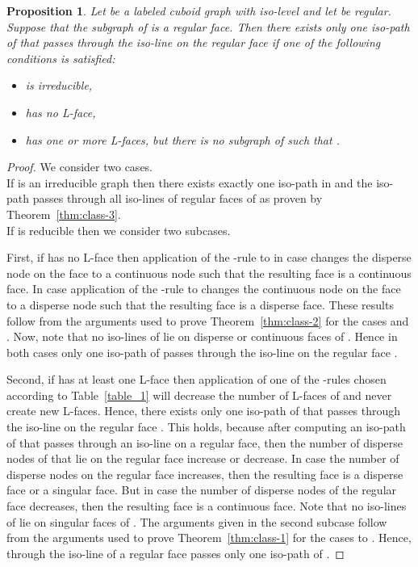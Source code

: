 \documentclass[a4paper,11pt]{article}
\newtheorem{proposition}[theorem]{Proposition}
\begin{document}
\begin{proposition}
Let  be a labeled cuboid graph with iso-level  and let  be regular.
Suppose that the subgraph  of  is a regular face. Then there exists only one
iso-path of  that passes through the iso-line on the regular face  if one of the following
conditions is satisfied:
\begin{itemize}
\item[(a)]  is irreducible,
\item[(b)]  has no L-face,
\item[(c)]  has one or more L-faces, but there is no subgraph  of
 such that .
\end{itemize}
\label{prop:class-7}
\end{proposition}
\begin{proof} We consider two cases.\\

If  is an irreducible graph then there exists exactly one iso-path in  and the
iso-path passes through all iso-lines of regular faces of  as proven by Theorem~\ref{thm:class-3}. \\

If  is reducible then we consider two subcases.

First, if  has no L-face then application of the -rule to  in case  changes the disperse
node on the face to a continuous node such that the resulting face is a continuous face. In case 
application of the -rule to  changes the continuous node on the face to a disperse node such that
the resulting face is a disperse face. These results follow from the arguments used to prove
Theorem~\ref{thm:class-2} for the cases  and . Now, note that no iso-lines of  lie on
disperse or continuous faces of . Hence in both cases only one iso-path of  passes through the iso-line
on the regular face .

Second, if  has at least one L-face then application of one of the -rules chosen according to
Table~\ref{table_1} will decrease the number of L-faces of  and never create new L-faces. Hence, there
exists only one iso-path of  that passes through the iso-line on the regular face . This holds,
because after computing an iso-path of  that passes through an iso-line on a regular face, then the
number of disperse nodes of  that lie on the regular face increase or decrease. In case the number of
disperse nodes on the regular face increases, then the resulting face is a disperse face or a singular face.
But in case the number of disperse nodes of the regular face decreases, then the resulting face is a
continuous face. Note that no iso-lines of  lie on singular faces of . The arguments given in the
second subcase follow from the arguments used to prove Theorem~\ref{thm:class-1} for the cases 
to . Hence, through the iso-line of a regular face  passes only one iso-path of .
\end{proof}
\end{document}
